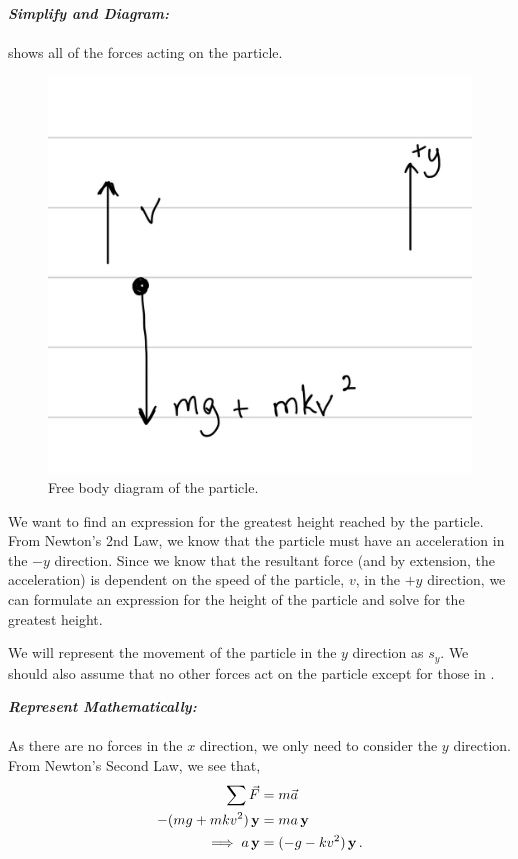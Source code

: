 \begin{subquestions}
\textbf{\textit{Simplify and Diagram:}} \\ \\
 shows all of the forces acting on the particle.
\begin{figure}[H]
	\begin{center}
		\includegraphics[scale=0.25]{../2007/figures/2008Mq6Diagram}
		\caption{\label{2008M:q6:Diagram1} Free body diagram of the particle.}
	\end{center}
\end{figure}
We want to find an expression for the greatest height reached by the particle. From Newton's 2nd Law, we know that the particle must have an acceleration in the $-y$ direction. Since we know that the resultant force (and by extension, the acceleration) is dependent on the speed of the particle, $v$, in the $+y$ direction, we can formulate an expression for the height of the particle and solve for the greatest height.

We will represent the movement of the particle in the $y$ direction as $s_y$.
We should also assume that no other forces act on the particle except for those in . 




\textbf{\textit{Represent Mathematically:}} \\ \\
As there are no forces in the $x$ direction, we only need to consider the $y$ direction. From Newton's Second Law, we see that,
\begin{align}
	\sum \vec{F} & = m\vec{a} \nonumber \\
	-(mg+mkv^2) \,\mathbf{y} & = ma \,\mathbf{y} \nonumber \\
	\implies a \,\mathbf{y} & = (-g -kv^2)\,\mathbf{y} \,.
\end{align}


\end{subquestions}
